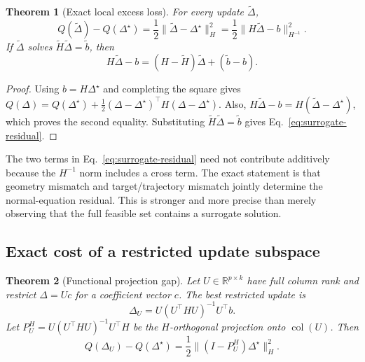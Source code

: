 \documentclass[letterpaper]{article} %
\theoremstyle{plain}
\newtheorem{theorem}{Theorem}
\theoremstyle{definition}
\begin{document}
\begin{theorem}[Exact local excess loss]
\label{thm:exact-gap}
For every update $\widetilde\Delta$,
\begin{equation}
Q(\widetilde\Delta)-Q(\Delta^\star)
=\frac12\|\widetilde\Delta-\Delta^\star\|_H^2
=\frac12\|H\widetilde\Delta-b\|_{H^{-1}}^2.
\label{eq:exact-gap}
\end{equation}
If $\widetilde\Delta$ solves $\widetilde H\widetilde\Delta=\widetilde b$, then
\begin{equation}
H\widetilde\Delta-b
=(H-\widetilde H)\widetilde\Delta+(\widetilde b-b).
\label{eq:surrogate-residual}
\end{equation}
\end{theorem}

\begin{proof}
Using $b=H\Delta^\star$ and completing the square gives $Q(\Delta)=Q(\Delta^\star)+ \frac12(\Delta-\Delta^\star)^\top H(\Delta-\Delta^\star)$.
Also, $H\widetilde\Delta-b=H(\widetilde\Delta-\Delta^\star)$, which proves the second equality.
Substituting $\widetilde H\widetilde\Delta=\widetilde b$ gives Eq.~\eqref{eq:surrogate-residual}.
\end{proof}

The two terms in Eq.~\eqref{eq:surrogate-residual} need not contribute additively because the $H^{-1}$ norm includes a cross term.
The exact statement is that geometry mismatch and target/trajectory mismatch jointly determine the normal-equation residual.
This is stronger and more precise than merely observing that the full feasible set contains a surrogate solution.

\subsection{Exact cost of a restricted update subspace}
\label{app:subspace-gap}

\begin{theorem}[Functional projection gap]
\label{thm:subspace-gap}
Let $U\in\mathbb R^{p\times k}$ have full column rank and restrict $\Delta=Uc$ for a coefficient vector $c$.
The best restricted update is
\begin{equation}
\Delta_U
=U(U^\top HU)^{-1}U^\top b.
\label{eq:restricted-update}
\end{equation}
Let $P_U^H=U(U^\top HU)^{-1}U^\top H$ be the $H$-orthogonal projection onto $\operatorname{col}(U)$.
Then
\begin{equation}
Q(\Delta_U)-Q(\Delta^\star)
=\frac12\|(I-P_U^H)\Delta^\star\|_H^2.
\label{eq:subspace-gap}
\end{equation}
\end{theorem}
\end{document}
